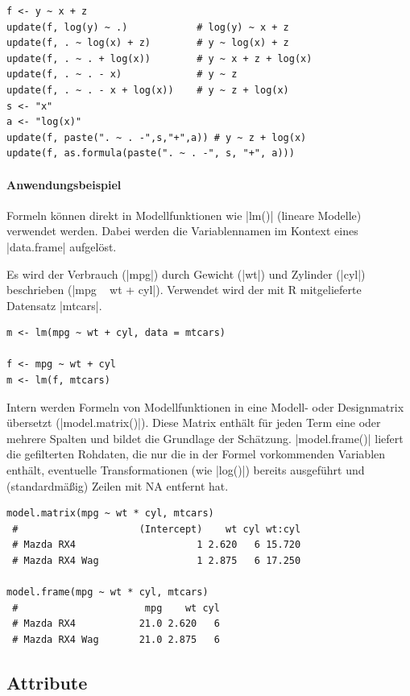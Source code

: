 \documentclass[10pt,twocolumn]{scrartcl}
\renewcommand{\lstinline}{\mycoloredinline}
\begin{document}
\begin{lstlisting}
f <- y ~ x + z
update(f, log(y) ~ .)            # log(y) ~ x + z
update(f, . ~ log(x) + z)        # y ~ log(x) + z
update(f, . ~ . + log(x))        # y ~ x + z + log(x)
update(f, . ~ . - x)             # y ~ z
update(f, . ~ . - x + log(x))    # y ~ z + log(x)
s <- "x"
a <- "log(x)"
update(f, paste(". ~ . -",s,"+",a)) # y ~ z + log(x)
update(f, as.formula(paste(". ~ . -", s, "+", a)))
\end{lstlisting}


\paragraph{Anwendungsbeispiel}

Formeln können direkt in Modellfunktionen wie \lstinline|lm()| (lineare Modelle) verwendet werden. Dabei werden die Variablennamen im Kontext eines \lstinline|data.frame| aufgelöst.

Es wird der Verbrauch (\lstinline|mpg|) durch Gewicht (\lstinline|wt|) und Zylinder (\lstinline|cyl|) beschrieben (\lstinline|mpg ~ wt + cyl|). Verwendet wird der mit R mitgelieferte Datensatz \lstinline|mtcars|.

\begin{lstlisting}
m <- lm(mpg ~ wt + cyl, data = mtcars)

f <- mpg ~ wt + cyl
m <- lm(f, mtcars)
\end{lstlisting}

Intern werden Formeln von Modellfunktionen in eine Modell- oder Designmatrix übersetzt (\lstinline|model.matrix()|). Diese Matrix enthält für jeden Term eine oder mehrere Spalten und bildet die Grundlage der Schätzung. \lstinline|model.frame()| liefert die gefilterten Rohdaten, die nur die in der Formel vorkommenden Variablen enthält, eventuelle Transformationen (wie \lstinline|log()|) bereits ausgeführt und (standardmäßig) Zeilen mit NA entfernt hat.

\begin{lstlisting}
model.matrix(mpg ~ wt * cyl, mtcars)
 #                     (Intercept)    wt cyl wt:cyl
 # Mazda RX4                     1 2.620   6 15.720
 # Mazda RX4 Wag                 1 2.875   6 17.250

model.frame(mpg ~ wt * cyl, mtcars)
 #                      mpg    wt cyl
 # Mazda RX4           21.0 2.620   6
 # Mazda RX4 Wag       21.0 2.875   6
\end{lstlisting}


\subsection{Attribute}
\end{document}
